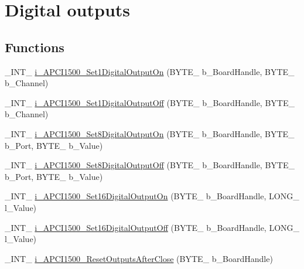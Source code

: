 \hypertarget{group___dig_i_out_cmp_d_l_l}{}\section{Digital outputs}
\label{group___dig_i_out_cmp_d_l_l}
\subsection*{Functions}
\begin{DoxyCompactItemize}
\item 
\+\_\+\+I\+N\+T\+\_\+ \mbox{\hyperlink{group___dig_i_out_cmp_d_l_l_ga4f29155ed15df89f2eb9adda70aff8dd}{i\+\_\+\+A\+P\+C\+I1500\+\_\+\+Set1\+Digital\+Output\+On}} (B\+Y\+T\+E\+\_\+ b\+\_\+\+Board\+Handle, B\+Y\+T\+E\+\_\+ b\+\_\+\+Channel)
\item 
\+\_\+\+I\+N\+T\+\_\+ \mbox{\hyperlink{group___dig_i_out_cmp_d_l_l_ga9eda92ebaff799b1c11bb1b9ee1398a5}{i\+\_\+\+A\+P\+C\+I1500\+\_\+\+Set1\+Digital\+Output\+Off}} (B\+Y\+T\+E\+\_\+ b\+\_\+\+Board\+Handle, B\+Y\+T\+E\+\_\+ b\+\_\+\+Channel)
\item 
\+\_\+\+I\+N\+T\+\_\+ \mbox{\hyperlink{group___dig_i_out_cmp_d_l_l_ga439a1e1515a453090470a6f61824b3fd}{i\+\_\+\+A\+P\+C\+I1500\+\_\+\+Set8\+Digital\+Output\+On}} (B\+Y\+T\+E\+\_\+ b\+\_\+\+Board\+Handle, B\+Y\+T\+E\+\_\+ b\+\_\+\+Port, B\+Y\+T\+E\+\_\+ b\+\_\+\+Value)
\item 
\+\_\+\+I\+N\+T\+\_\+ \mbox{\hyperlink{group___dig_i_out_cmp_d_l_l_ga862584b98c34377450f35f8f88c19975}{i\+\_\+\+A\+P\+C\+I1500\+\_\+\+Set8\+Digital\+Output\+Off}} (B\+Y\+T\+E\+\_\+ b\+\_\+\+Board\+Handle, B\+Y\+T\+E\+\_\+ b\+\_\+\+Port, B\+Y\+T\+E\+\_\+ b\+\_\+\+Value)
\item 
\+\_\+\+I\+N\+T\+\_\+ \mbox{\hyperlink{group___dig_i_out_cmp_d_l_l_ga956ca22ff1ea8ca5c4381d2cc4e42e94}{i\+\_\+\+A\+P\+C\+I1500\+\_\+\+Set16\+Digital\+Output\+On}} (B\+Y\+T\+E\+\_\+ b\+\_\+\+Board\+Handle, L\+O\+N\+G\+\_\+ l\+\_\+\+Value)
\item 
\+\_\+\+I\+N\+T\+\_\+ \mbox{\hyperlink{group___dig_i_out_cmp_d_l_l_ga2daabf430576f988eeb5880d93d5656d}{i\+\_\+\+A\+P\+C\+I1500\+\_\+\+Set16\+Digital\+Output\+Off}} (B\+Y\+T\+E\+\_\+ b\+\_\+\+Board\+Handle, L\+O\+N\+G\+\_\+ l\+\_\+\+Value)
\item 
\+\_\+\+I\+N\+T\+\_\+ \mbox{\hyperlink{group___dig_i_out_cmp_d_l_l_ga5a65096e11ef3b94118f094dd6f692b7}{i\+\_\+\+A\+P\+C\+I1500\+\_\+\+Reset\+Outputs\+After\+Close}} (B\+Y\+T\+E\+\_\+ b\+\_\+\+Board\+Handle)
\end{DoxyCompactItemize}


